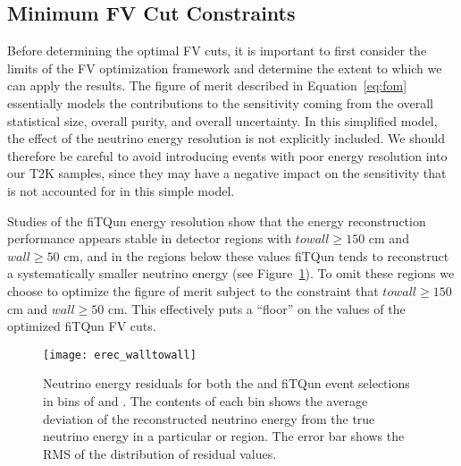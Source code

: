 \subsection{Minimum FV Cut Constraints}
\label{subsec:floor}


Before determining the optimal FV cuts, it is important to first consider the
limits of the FV optimization framework and determine the extent to which we
can apply the results.  The figure of merit described in Equation~\ref{eq:fom}
essentially models the contributions to the sensitivity coming from the overall
statistical size, overall purity, and overall uncertainty.  In this simplified
model, the effect of the neutrino energy resolution is not explicitly included.
We should therefore be careful to avoid introducing events with poor energy
resolution into our T2K samples, since they may have a negative impact on the
sensitivity that is not accounted for in this simple model. 

Studies of the fiTQun energy resolution show that the energy reconstruction
performance appears stable in detector regions with $towall \ge 150$ cm and
$wall \ge 50$ cm, and in the regions below these values fiTQun tends to reconstruct 
a systematically smaller neutrino energy (see Figure~\ref{fig:erec}).  To omit these regions we
choose to optimize the figure of merit subject to the constraint that $towall
\ge 150$ cm and $wall \ge 50$ cm.  This effectively puts a ``floor'' on the
values of the optimized fiTQun FV cuts.

\begin{figure}[h!]
  \begin{center}
    \texttt{[image: erec\_walltowall]}
  \end{center}
  \caption{Neutrino energy residuals for both the \nue and \numu fiTQun event selections in bins
  of \wall and \towall.  The contents of each bin shows the average deviation of the reconstructed
  neutrino energy from the true neutrino energy in a particular \towall or 
  \wall region.  The error bar shows the RMS of the distribution of residual values.}
  \label{fig:erec}
\end{figure}

